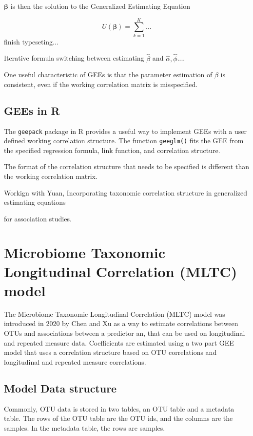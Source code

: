 \documentclass[12pt]{article}
\begin{document}
$\boldsymbol\beta$ is then the solution to the Generalized Estimating Equation

$$U(\boldsymbol\beta) = \sum_{k = 1}^K \ldots $$
finish typeseting...

Iterative formula switching between estimating $\hat\beta$ and $\hat \alpha, \hat \phi$....

One useful characteristic of GEEs is that the parameter estimation of $\beta$ is consistent, even if the working correlation matrix is misspecified.

\subsection{GEEs in R}

The \texttt{geepack} package\cite{geepack} in R \cite{R} provides a useful way to implement GEEs with a user defined working correlation structure. The function \texttt{geeglm()} fits the GEE from the specified regression formula, link function, and correlation structure.

The format of the correlation structure that needs to be specified is different than the working correlation matrix.

Workign with Yuan,
Incorporating taxonomic correlation structure in generalized estimating equations


 for association studies.

\section{Microbiome Taxonomic Longitudinal Correlation (MLTC) model}

The Microbiome Taxonomic Longitudinal Correlation (MLTC) model was introduced in 2020 by Chen and Xu\cite{chen2020generalized} as a way to estimate correlations between OTUs and associations between a predictor an, that can be used on longitudinal and repeated measure data. Coefficients are estimated using a two part GEE model that uses a correlation structure based on OTU correlations and longitudinal and repeated measure correlations.



\subsection{Model Data structure}
Commonly, OTU data is stored in two tables, an OTU table and a metadata table. The rows of the OTU table are the OTU ids, and the columns are the samples. In the metadata table, the rows are samples.
\end{document}
